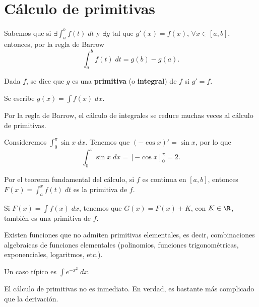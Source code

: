 \chapter{Cálculo de primitivas}
Sabemos que si $\displaystyle \exists \int^{b}_{a} f\left(t\right) \; dt $ y $\displaystyle \exists g $ tal que $\displaystyle g'\left(x\right) = f\left(x\right) $, $\displaystyle \forall x \in \left[a,b\right]  $, entonces, por la regla de Barrow
\[\int^{b}_{a} f\left(t\right) \; dt = g\left(b\right)-g\left(a\right) .\]
\begin{fdefinition}[Primitiva]
\normalfont Dada $\displaystyle f $, se dice que $\displaystyle g $ es una \textbf{primitiva} (o \textbf{integral}) de $\displaystyle f $ si $\displaystyle g' = f $.
\end{fdefinition}
\begin{notation}
\normalfont Se escribe $\displaystyle g\left(x\right) = \int f\left(x\right) \; dx $.
\end{notation}
\begin{observation}
\normalfont Por la regla de Barrow, el cálculo de integrales se reduce muchas veces al cálculo de primitivas.
\end{observation}
\begin{eg}
\normalfont Consideremos $\displaystyle \int^{\pi}_{0} \sin x \; dx $. Tenemos que $\displaystyle \left(-\cos x\right)' = \sin x $, por lo que 
\[ \int^{\pi }_{0} \sin x  \; dx = \left[-\cos x\right] ^{\pi }_{0} = 2 .\]
\end{eg}
\begin{observation}
	\normalfont Por el teorema fundamental del cálculo, si $\displaystyle f $ es continua en $\displaystyle \left[a,b\right]  $, entonces $\displaystyle F\left(x\right) = \int^{x}_{a} f\left(t\right) \; dt $ es la primitiva de $\displaystyle f $.
\end{observation}
\begin{observation}
\normalfont Si $\displaystyle F\left(x\right) = \int f\left(x\right) \; dx$, tenemos que $\displaystyle G\left(x\right) = F\left(x\right) + K $, con $\displaystyle K \in \R $, también es una primitiva de $\displaystyle f $. 
\end{observation}
Existen funciones que no admiten primitivas elementales, es decir, combinaciones algebraicas de funciones elementales (polinomios, funciones trigonométricas, exponenciales, logaritmos, etc.).
\begin{eg}
\normalfont Un caso típico es $\displaystyle \int e^{-x^{2}} \; dx $.
\end{eg}
\begin{observation}
\normalfont El cálculo de primitivas no es inmediato. En verdad, es bastante más complicado que la derivación.
\end{observation}

